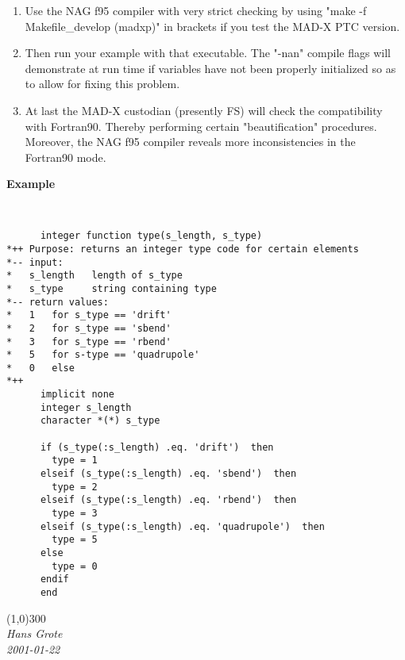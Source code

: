 \begin{itemize}
\begin{enumerate}
	\item  Use the NAG f95 compiler with very strict checking by using "make -f Makefile\_develop (madxp)" in brackets if you test the MAD-X         PTC version.
	\item  Then run your example with that executable. The "-nan" compile         flags will demonstrate at run time if variables have not been properly initialized so as to allow for fixing this problem.  
	\item  At last the MAD-X custodian (presently FS) will check the         compatibility with Fortran90. Thereby performing certain         "beautification" procedures. Moreover, the NAG f95 compiler         reveals more inconsistencies in the Fortran90 mode.  
\end{enumerate}
\end{itemize}\textbf{ Example}
\begin{verbatim}


      integer function type(s_length, s_type)
*++ Purpose: returns an integer type code for certain elements
*-- input:
*   s_length   length of s_type
*   s_type     string containing type
*-- return values:
*   1   for s_type == 'drift'
*   2   for s_type == 'sbend'
*   3   for s_type == 'rbend'
*   5   for s-type == 'quadrupole'
*   0   else
*++
      implicit none
      integer s_length
      character *(*) s_type

      if (s_type(:s_length) .eq. 'drift')  then
        type = 1
      elseif (s_type(:s_length) .eq. 'sbend')  then
        type = 2
      elseif (s_type(:s_length) .eq. 'rbend')  then
        type = 3
      elseif (s_type(:s_length) .eq. 'quadrupole')  then
        type = 5
      else
        type = 0
      endif
      end
\end{verbatim}

\line(1,0){300}
\\
\textit{Hans Grote}
\\\textit{2001-01-22}

